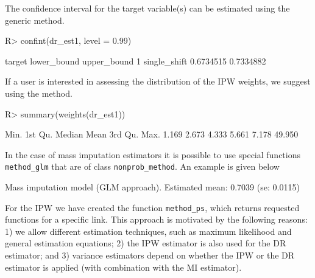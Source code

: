 \documentclass[
]{jss}
\begin{document}
The confidence interval for the target variable(s) can be estimated
using the generic  method.

\begin{CodeChunk}
\begin{CodeInput}
R> confint(dr_est1, level = 0.99)
\end{CodeInput}
\begin{CodeOutput}
        target lower_bound upper_bound
1 single_shift   0.6734515   0.7334882
\end{CodeOutput}
\end{CodeChunk}

If a user is interested in assessing the distribution of the IPW
weights, we suggest using the  method.

\begin{CodeChunk}
\begin{CodeInput}
R> summary(weights(dr_est1))
\end{CodeInput}
\begin{CodeOutput}
   Min. 1st Qu.  Median    Mean 3rd Qu.    Max. 
  1.169   2.673   4.333   5.661   7.178  49.950 
\end{CodeOutput}
\end{CodeChunk}

In the case of mass imputation estimators it is possible to use special
functions \texttt{method\_glm} that are of class
\texttt{nonprob\_method}. An example is given below

\begin{CodeChunk}
\begin{CodeOutput}
Mass imputation model (GLM approach). Estimated mean: 0.7039 (se: 0.0115)
\end{CodeOutput}
\end{CodeChunk}

For the IPW we have created the function \texttt{method\_ps}, which
returns requested functions for a specific link. This approach is
motivated by the following reasons: 1) we allow different estimation
techniques, such as maximum likelihood and general estimation equations;
2) the IPW estimator is also used for the DR estimator; and 3) variance
estimators depend on whether the IPW or the DR estimator is applied
(with combination with the MI estimator).
\end{document}
